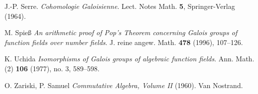 \begin{thebibliography}{999999}
    J.-P. Serre.
    \textit{Cohomologie Galoisienne}.
    Lect. Notes Math. \textbf{5}, Springer-Verlag (1964).
    
	M. Spieß
	\textit{An arithmetic proof of Pop's Theorem concerning Galois groups of function fields over number fields}.
    J. reine angew. Math. \textbf{478} (1996), 107\---126.

    K. Uchida
    \textit{Isomorphisms of Galois groups of algebraic function fields}.
    Ann. Math. (2) \textbf{106} (1977), no. 3, 589\---598.
  
    O. Zariski, P. Samuel
    \textit{Commutative Algebra, Volume II} (1960). 
    Van Nostrand. 

\end{thebibliography}
